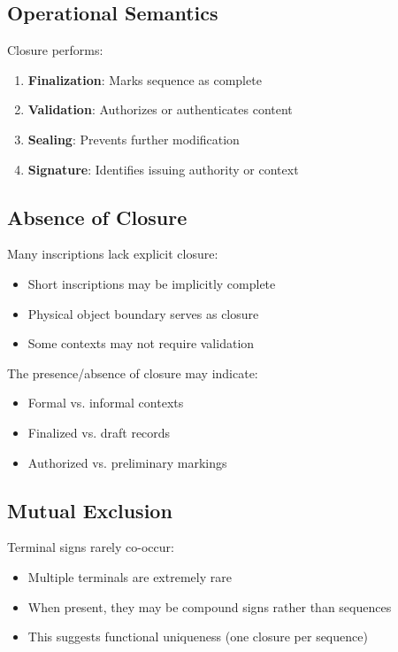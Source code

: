 \subsection{Operational Semantics}

Closure performs:
\begin{enumerate}
    \item \textbf{Finalization}: Marks sequence as complete
    \item \textbf{Validation}: Authorizes or authenticates content
    \item \textbf{Sealing}: Prevents further modification
    \item \textbf{Signature}: Identifies issuing authority or context
\end{enumerate}

\subsection{Absence of Closure}

Many inscriptions lack explicit closure:
\begin{itemize}
    \item Short inscriptions may be implicitly complete
    \item Physical object boundary serves as closure
    \item Some contexts may not require validation
\end{itemize}

The presence/absence of closure may indicate:
\begin{itemize}
    \item Formal vs. informal contexts
    \item Finalized vs. draft records
    \item Authorized vs. preliminary markings
\end{itemize}

\subsection{Mutual Exclusion}

Terminal signs rarely co-occur:
\begin{itemize}
    \item Multiple terminals are extremely rare
    \item When present, they may be compound signs rather than sequences
    \item This suggests functional uniqueness (one closure per sequence)
\end{itemize}

